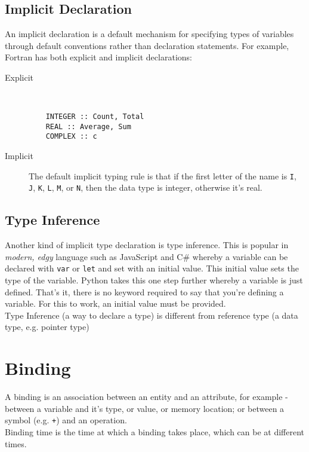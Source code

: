 \subsection{Implicit Declaration}
An implicit declaration is a default mechanism for specifying types of variables through default conventions rather than declaration statements. For example, Fortran has both explicit and implicit declarations:
\begin{description}
    \item[Explicit]\ 
    \begin{verbatim}
    INTEGER :: Count, Total
    REAL :: Average, Sum
    COMPLEX :: c
    \end{verbatim}
    \item[Implicit] The default implicit typing rule is that if the first letter of the name is \verb|I|, \verb|J|, \verb|K|, \verb|L|, \verb|M|, or \verb|N|, then the data type is integer, otherwise it's real.
\end{description}
\subsection{Type Inference}
Another kind of implicit type declaration is type inference. This is popular in \textit{modern, edgy} language such as JavaScript and C\# whereby a variable can be declared with \verb|var| or \verb|let| and set with an initial value. This initial value sets the type of the variable. Python takes this one step further whereby a variable is just defined. That's it, there is no keyword required to say that you're defining a variable. For this to work, an initial value must be provided.\\

Type Inference (a way to declare a type) is different from reference type (a data type, e.g. pointer type)

\section{Binding}
A binding is an association between an entity and an attribute, for example - between a variable and it's type, or value, or memory location; or between a symbol (e.g. \verb|+|) and an operation.\\

Binding time is the time at which a binding takes place, which can be at different times. 

